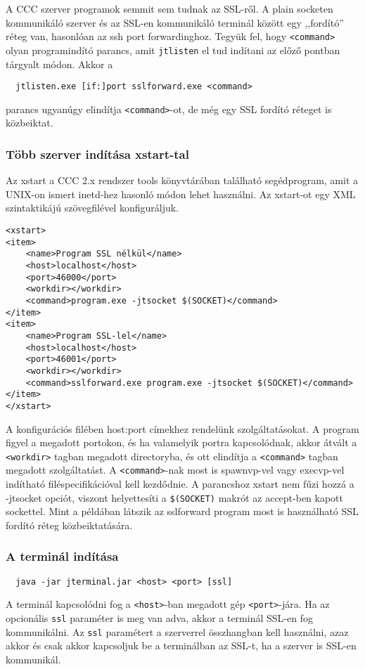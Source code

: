 A CCC szerver programok semmit sem tudnak 
az SSL-ről. A plain socketen kommunikáló szerver 
és az SSL-en kommunikáló terminál között egy  ,,fordító''
réteg van, hasonlóan az ssh port forwardinghoz.
Tegyük fel, hogy \verb!<command>! olyan programindító parancs,
amit \verb!jtlisten! el tud indítani az előző pontban
tárgyalt módon. Akkor a 
\begin{verbatim}
  jtlisten.exe [if:]port sslforward.exe <command>
\end{verbatim}
parancs ugyanúgy elindítja  \verb!<command>!-ot, de még
egy SSL fordító réteget is közbeiktat.


\subsubsection{Több szerver indítása xstart-tal}

Az xstart a CCC 2.x rendszer tools könyvtárában található segédprogram, 
amit a UNIX-on ismert inetd-hez hasonló módon lehet használni.
Az xstart-ot egy XML szintaktikájú szövegfilével konfiguráljuk.

\begin{verbatim}
<xstart>
<item>
    <name>Program SSL nélkül</name>
    <host>localhost</host>
    <port>46000</port>
    <workdir></workdir>
    <command>program.exe -jtsocket $(SOCKET)</command>
</item>
<item>
    <name>Program SSL-lel</name>
    <host>localhost</host>
    <port>46001</port>
    <workdir></workdir>
    <command>sslforward.exe program.exe -jtsocket $(SOCKET)</command>
</item>
</xstart>
\end{verbatim}
 
A konfigurációs filében host:port címekhez rendelünk szolgáltatásokat.
A program figyel a megadott portokon, és ha valamelyik portra
kapcsolódnak, akkor átvált a \verb!<workdir>! tagban megadott directoryba, 
és ott elindítja a \verb!<command>! tagban megadott szolgáltatást.
A \verb!<command>!-nak most is spawnvp-vel vagy execvp-vel
indítható filéspecifikációval kell kezdődnie.
A parancshoz xstart nem fűzi hozzá a -jtsocket opciót,
viszont helyettesíti a \verb!$(SOCKET)! makrót az accept-ben
kapott sockettel. Mint a példában látszik az sslforward program
most is használható SSL fordító réteg közbeiktatására.


\subsubsection{A terminál indítása}

\begin{verbatim}
  java -jar jterminal.jar <host> <port> [ssl]
\end{verbatim}

A terminál kapcsolódni fog a \verb!<host>!-ban  megadott gép
\verb!<port>!-jára. Ha az opcionális \verb!ssl!  paraméter
is meg van adva, akkor a terminál SSL-en fog kommunikálni.
Az \verb!ssl! paramétert a szerverrel összhangban kell használni,
azaz akkor és csak akkor kapcsoljuk be a terminálban az SSL-t,
ha a szerver is SSL-en kommunikál.
